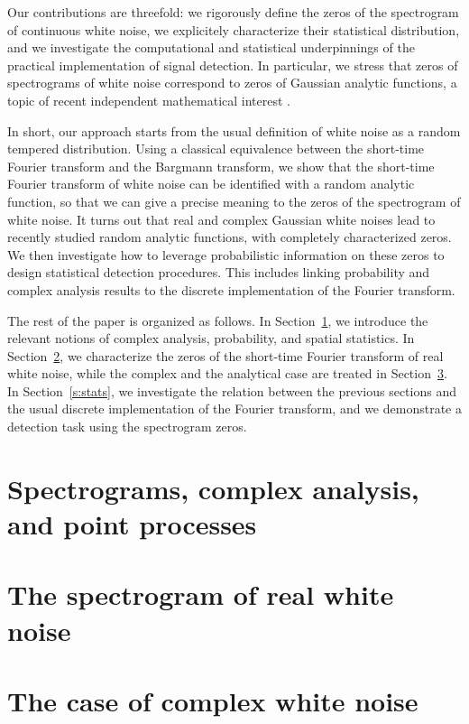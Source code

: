 \documentclass{article}
\theoremstyle{plain}
\theoremstyle{remark}
\begin{document}
Our contributions are threefold: we rigorously define the zeros of the
spectrogram of continuous white noise, we explicitely characterize their
statistical distribution, and we investigate the computational and statistical
underpinnings of the practical implementation of signal detection. In
particular, we stress that zeros of spectrograms of white noise correspond to
zeros of Gaussian analytic functions, a topic of recent independent mathematical interest \citep{HKPV09}.

In short, our approach starts from the usual definition of white noise as a random
tempered distribution. Using a classical equivalence between the short-time
Fourier transform and the Bargmann transform, we show that the short-time
Fourier transform of white noise can be identified with a random analytic
function, so that we can give a precise meaning to the zeros of the spectrogram of white
noise. It turns out that real and complex Gaussian white noises lead to
recently studied random analytic functions, with completely characterized zeros. We
then investigate how to leverage probabilistic information on these zeros to design
statistical detection procedures. This includes linking probability and
complex analysis results to the discrete implementation of the Fourier
transform.

The rest of the paper is organized as follows. In Section~\ref{s:preliminary},
we introduce the relevant notions of complex analysis, probability, and spatial
statistics. In Section~\ref{s:real}, we characterize the zeros of the short-time
Fourier transform of real white noise, while the complex and the analytical case
are treated in Section~\ref{s:complex}. In Section~\ref{s:stats}, we investigate
the relation between the previous sections and the usual discrete implementation
of the Fourier transform, and we demonstrate a detection task using the spectrogram zeros.


\section{Spectrograms, complex analysis, and point processes}
\label{s:preliminary}


\section{The spectrogram of real white noise}
\label{s:real}


\section{The case of complex white noise}
\label{s:complex}

\end{document}
